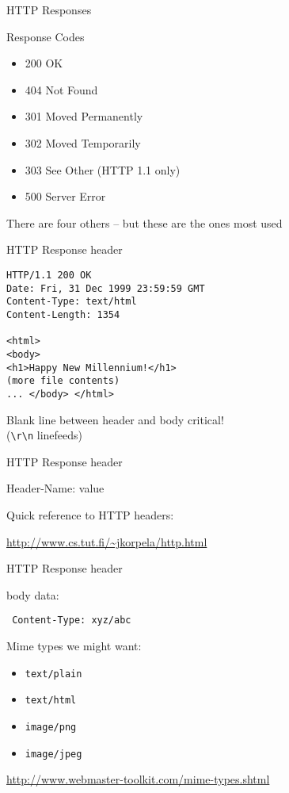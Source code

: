 \documentclass{beamer}
\begin{document}
\begin{frame}{HTTP Responses}

{\Large Response Codes}

\begin{itemize}
\item 200 OK
\item 404 Not Found
\item 301 Moved Permanently
\item 302 Moved Temporarily
\item 303 See Other (HTTP 1.1 only)
\item 500 Server Error
\end{itemize}

\vfill
There are four others -- but these are the ones most used
\end{frame}

\begin{frame}[fragile]{HTTP Response header}

\begin{verbatim}
HTTP/1.1 200 OK
Date: Fri, 31 Dec 1999 23:59:59 GMT
Content-Type: text/html
Content-Length: 1354

<html>
<body>
<h1>Happy New Millennium!</h1>
(more file contents)
... </body> </html>
\end{verbatim}

\vfill
Blank line between header and body critical!\\
 \hspace{0.25in} (\verb|\r\n| linefeeds)
\end{frame}

\begin{frame}[fragile]{HTTP Response header}

{\Large Header-Name: value}

\vfill
{\Large Quick reference to HTTP headers:}

\vfill
\url{http://www.cs.tut.fi/~jkorpela/http.html}
\end{frame}

\begin{frame}[fragile]{HTTP Response header}

{\Large body data:

\vfill
\verb| Content-Type: xyz/abc | 

\vfill
Mime types we might want:
}

\begin{itemize}
  \item \verb|text/plain|
  \item \verb|text/html|
  \item \verb|image/png|
  \item \verb|image/jpeg|
\end{itemize}

\vfill
\url{http://www.webmaster-toolkit.com/mime-types.shtml}
\end{frame}
\end{document}
